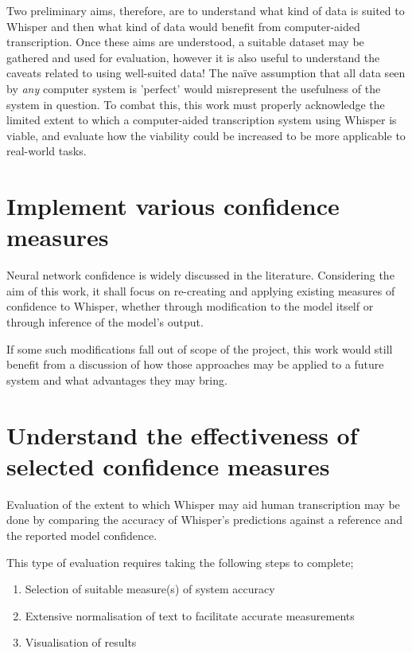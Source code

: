 Two preliminary aims, therefore, are to understand what kind of data is suited to Whisper and then what kind of data would benefit from computer-aided transcription.
Once these aims are understood, a suitable dataset may be gathered and used for evaluation, however it is also useful to understand the caveats related to using well-suited data!
The na\"{i}ve assumption that all data seen by \emph{any} computer system is 'perfect' would misrepresent the usefulness of the system in question.
To combat this, this work must properly acknowledge the limited extent to which a computer-aided transcription system using Whisper is viable, and evaluate how the viability could be increased to be more applicable to real-world tasks.

\section{Implement various confidence measures}

Neural network confidence is widely discussed in the literature.
Considering the aim of this work, it shall focus on re-creating and applying existing measures of confidence to Whisper, whether through modification to the model itself or through inference of the model's output.

If some such modifications fall out of scope of the project, this work would still benefit from a discussion of how those approaches may be applied to a future system and what advantages they may bring.

\section{Understand the effectiveness of selected confidence measures}

Evaluation of the extent to which Whisper may aid human transcription may be done by comparing the accuracy of Whisper's predictions against a reference and the reported model confidence.

This type of evaluation requires taking the following steps to complete;

\begin{enumerate}
        \item Selection of suitable measure(s) of system accuracy
        \item Extensive normalisation of text to facilitate accurate measurements
        \item Visualisation of results
\end{enumerate}

